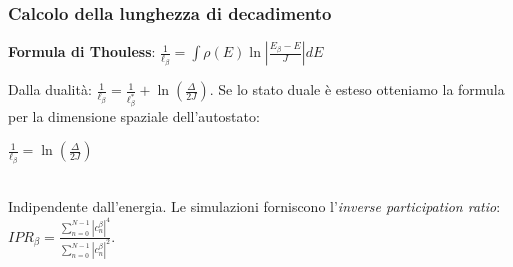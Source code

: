 \documentclass[10pt, t]{beamer}
\begin{document}
\begin{frame}

\frametitle{Calcolo della lunghezza di decadimento}

\begin{center}

\textbf{Formula di Thouless}: $\frac{1}{\ell_{\beta}} = \int \rho (E) \ln \left| \frac{E_{\beta} - E}{J} \right| dE$


Dalla dualità: $\frac{1}{\ell_{\beta}} = \frac{1}{\ell^{*}_{\beta}} + \ln \left( \frac{\Delta}{2 J} \right)$. Se lo stato duale è esteso otteniamo la formula per la dimensione spaziale dell'autostato:\\
\vspace{10pt}
\begin{large}
$\frac{1}{\ell_{\beta}} = \ln(\frac{\Delta}{2 J})$
\end{large}\\
\vspace{10pt}
Indipendente dall'energia. 
Le simulazioni forniscono l'\emph{inverse participation ratio}: $IPR_{\beta} = \frac{\sum_{n=0}^{N-1} |c^{\beta}_n|^4}{\sum_{n=0}^{N-1} |c^{\beta}_n|^2}$.




\end{center}
\end{frame}
\end{document}
